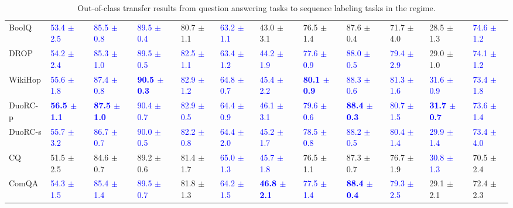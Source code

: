 \begin{landscape}
\begin{table}[t]
\begin{adjustbox}{max width=2\textwidth}
\begin{tabular}{ l l l l l  l l l l  l l l }
BoolQ & \textcolor{blue}{53.4 $\pm$ 2.5} & \textcolor{blue}{85.5 $\pm$ 0.8} & \textcolor{blue}{89.5 $\pm$ 0.4} & 80.7 $\pm$ 1.1 & \textcolor{blue}{63.2 $\pm$ 1.1} & 43.0 $\pm$ 3.1 & 76.5 $\pm$ 1.4 & 87.6 $\pm$ 0.4 & 71.7 $\pm$ 4.0 & 28.5 $\pm$ 1.3 & \textcolor{blue}{74.6 $\pm$ 1.2}\\
DROP & \textcolor{blue}{54.2 $\pm$ 2.4} & \textcolor{blue}{85.3 $\pm$ 1.0} & \textcolor{blue}{89.5 $\pm$ 0.5} & \textcolor{blue}{82.5 $\pm$ 1.1} & \textcolor{blue}{63.4 $\pm$ 1.2} & \textcolor{blue}{44.2 $\pm$ 1.9} & \textcolor{blue}{77.6 $\pm$ 0.9} & \textcolor{blue}{88.0 $\pm$ 0.5} & \textcolor{blue}{79.4 $\pm$ 2.9} & 29.0 $\pm$ 1.0 & \textcolor{blue}{74.1 $\pm$ 1.2}\\
WikiHop & \textcolor{blue}{55.6 $\pm$ 1.8} & \textcolor{blue}{87.4 $\pm$ 0.8} & \textbf{\textcolor{blue}{90.5 $\pm$ 0.3}} & \textcolor{blue}{82.9 $\pm$ 1.2} & \textcolor{blue}{64.8 $\pm$ 0.7} & \textcolor{blue}{45.4 $\pm$ 2.2} & \textbf{\textcolor{blue}{80.1 $\pm$ 0.9}} & \textcolor{blue}{88.3 $\pm$ 0.6} & \textcolor{blue}{81.3 $\pm$ 1.6} & \textcolor{blue}{31.6 $\pm$ 0.9} & \textcolor{blue}{73.4 $\pm$ 1.8}\\
DuoRC-p & \textbf{\textcolor{blue}{56.5 $\pm$ 1.1}} & \textbf{\textcolor{blue}{87.5 $\pm$ 1.0}} & \textcolor{blue}{90.4 $\pm$ 0.7} & \textcolor{blue}{82.9 $\pm$ 0.5} & \textcolor{blue}{64.4 $\pm$ 0.9} & \textcolor{blue}{46.1 $\pm$ 3.1} & \textcolor{blue}{79.6 $\pm$ 0.6} & \textbf{\textcolor{blue}{88.4 $\pm$ 0.3}} & \textcolor{blue}{80.7 $\pm$ 1.5} & \textbf{\textcolor{blue}{31.7 $\pm$ 0.7}} & \textcolor{blue}{73.6 $\pm$ 1.4}\\
DuoRC-s & \textcolor{blue}{55.7 $\pm$ 3.2} & \textcolor{blue}{86.7 $\pm$ 0.7} & \textcolor{blue}{90.0 $\pm$ 0.5} & \textcolor{blue}{82.2 $\pm$ 0.8} & \textcolor{blue}{64.4 $\pm$ 2.0} & \textcolor{blue}{45.2 $\pm$ 1.7} & \textcolor{blue}{78.5 $\pm$ 0.8} & \textcolor{blue}{88.2 $\pm$ 0.5} & \textcolor{blue}{80.4 $\pm$ 1.4} & \textcolor{blue}{29.9 $\pm$ 1.4} & \textcolor{blue}{73.4 $\pm$ 4.0}\\
CQ & 51.5 $\pm$ 2.5 & 84.6 $\pm$ 0.7 & 89.2 $\pm$ 0.6 & 81.4 $\pm$ 1.7 & \textcolor{blue}{65.0 $\pm$ 1.3} & \textcolor{blue}{45.7 $\pm$ 1.8} & 76.5 $\pm$ 1.1 & 87.3 $\pm$ 0.7 & 76.7 $\pm$ 1.9 & \textcolor{blue}{30.8 $\pm$ 1.3} & 70.5 $\pm$ 2.4\\
ComQA & \textcolor{blue}{54.3 $\pm$ 1.5} & \textcolor{blue}{85.4 $\pm$ 1.4} & \textcolor{blue}{89.5 $\pm$ 0.7} & 81.8 $\pm$ 1.3 & \textcolor{blue}{64.2 $\pm$ 1.5} & \textbf{\textcolor{blue}{46.8 $\pm$ 2.1}} & \textcolor{blue}{77.5 $\pm$ 1.4} & \textbf{\textcolor{blue}{88.4 $\pm$ 0.4}} & \textcolor{blue}{79.3 $\pm$ 2.5} & 29.1 $\pm$ 2.1 & 72.4 $\pm$ 2.3\\
\bottomrule
\end{tabular}
\end{adjustbox}
\caption{Out-of-class transfer results from question answering tasks to sequence labeling tasks in the   regime.}
\label{tbla12c}
\end{table}
\end{landscape}